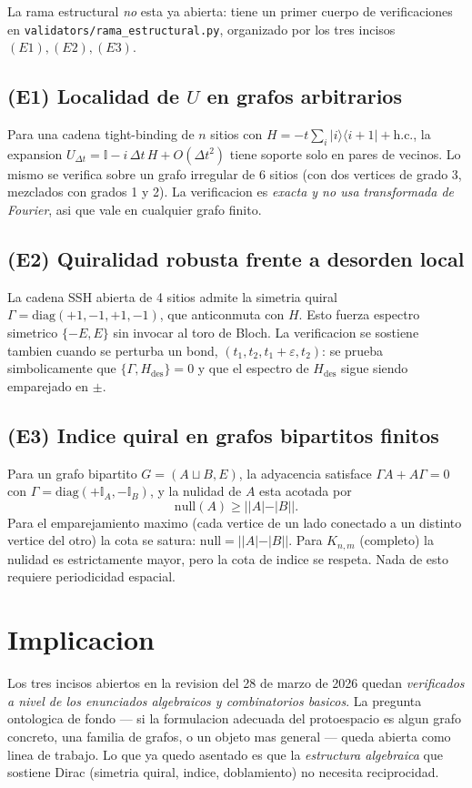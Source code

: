 La rama estructural \emph{no} esta ya abierta: tiene un primer cuerpo de
verificaciones en \texttt{validators/rama\_estructural.py}, organizado por
los tres incisos \((E1), (E2), (E3)\).

\subsection*{(E1) Localidad de \(U\) en grafos arbitrarios}
Para una cadena tight-binding de \(n\) sitios con \(H = -t \sum_i |i\rangle\langle i{+}1| + \mathrm{h.c.}\),
la expansion \(U_{\Delta t} = \mathbb{I} - i\,\Delta t\,H + O(\Delta t^2)\)
tiene soporte solo en pares de vecinos. Lo mismo se verifica sobre un grafo
irregular de 6 sitios (con dos vertices de grado 3, mezclados con grados 1
y 2). La verificacion es \emph{exacta y no usa transformada de Fourier},
asi que vale en cualquier grafo finito.

\subsection*{(E2) Quiralidad robusta frente a desorden local}
La cadena SSH abierta de 4 sitios admite la simetria quiral
\(\Gamma = \mathrm{diag}(+1,-1,+1,-1)\), que anticonmuta con \(H\).
Esto fuerza espectro simetrico \(\{-E, E\}\) sin invocar al toro de Bloch.
La verificacion se sostiene tambien cuando se perturba un bond,
\((t_1, t_2, t_1+\varepsilon, t_2)\): se prueba simbolicamente que
\(\{\Gamma, H_{\mathrm{des}}\} = 0\) y que el espectro de \(H_{\mathrm{des}}\)
sigue siendo emparejado en \(\pm\).

\subsection*{(E3) Indice quiral en grafos bipartitos finitos}
Para un grafo bipartito \(G = (A \sqcup B, E)\), la adyacencia satisface
\(\Gamma A + A \Gamma = 0\) con \(\Gamma = \mathrm{diag}(+\mathbb{I}_A, -\mathbb{I}_B)\),
y la nulidad de \(A\) esta acotada por
\[
  \mathrm{null}(A) \ge ||A| - |B||.
\]
Para el emparejamiento maximo (cada vertice de un lado conectado a un
distinto vertice del otro) la cota se satura: \(\mathrm{null} = ||A|-|B||\).
Para \(K_{n,m}\) (completo) la nulidad es estrictamente mayor, pero la cota
de indice se respeta. Nada de esto requiere periodicidad espacial.

\section{Implicacion}

Los tres incisos abiertos en la revision del 28 de marzo de 2026 quedan
\emph{verificados a nivel de los enunciados algebraicos y combinatorios
basicos}. La pregunta ontologica de fondo --- si la formulacion adecuada
del protoespacio es algun grafo concreto, una familia de grafos, o un
objeto mas general --- queda abierta como linea de trabajo. Lo que ya
quedo asentado es que la \emph{estructura algebraica} que sostiene Dirac
(simetria quiral, indice, doblamiento) no necesita reciprocidad.
